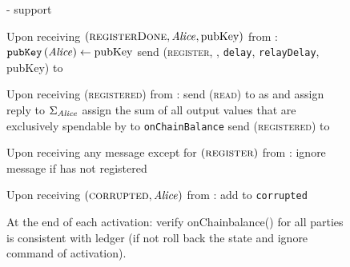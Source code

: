 \begin{figure}[H]
\begin{systembox}{\fpaynet - support}
\begin{algorithmic}[1]
        \State Upon receiving $\left(\textsc{registerDone}, \mathit{Alice},
        \mathrm{pubKey}\right)$ from \simulator:
        \Indent
          \State $\mathtt{pubKey}\left(\mathit{Alice}\right) \gets \mathrm{pubKey}$
          \State send (\textsc{register}, \alice, \texttt{delay},
          \texttt{relayDelay}, pubKey) to \alice
        \EndIndent
        \Statex

        \State Upon receiving (\textsc{registered}) from \alice:
        \Indent
          \State send (\textsc{read}) to \ledger{} as \alice{} and assign reply
          to $\Sigma_{\mathit{Alice}}$
          \State assign the sum of all output values that are exclusively
          spendable by \alice{} to \texttt{onChainBalance}
          \State send (\textsc{registered}) to \alice
        \EndIndent
        \Statex

        \State Upon receiving any message except for
        $\left(\textsc{register}\right)$ from \alice:
        \Indent
          \State ignore message if \alice{} has not registered
        \EndIndent
        \Statex

        \State Upon receiving $\left(\textsc{corrupted}, \mathit{Alice}\right)$ from
        \simulator:
        \Indent
          \State add \alice{} to \texttt{corrupted}
        \EndIndent
        \Statex

        \State At the end of each activation: 
        \Indent
          \State verify onChainbalance() for all parties is consistent with
          ledger (if not roll back the state and ignore command of activation).
        \EndIndent
      \end{algorithmic}
    \end{systembox}
    \caption{}
    \label{alg:fpaynet:support}
  \end{figure}

